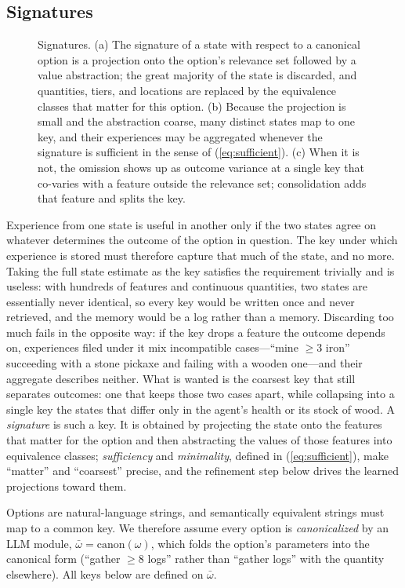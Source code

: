 \documentclass[11pt]{article}
\begin{document}
\subsection{Signatures}
\label{sec:signature}
\begin{figure}[t]
\centering

\caption{Signatures. (a) The signature of a state with respect to a canonical option is a projection onto the option's relevance set followed by a value abstraction; the great majority of the state is discarded, and quantities, tiers, and locations are replaced by the equivalence classes that matter for this option. (b) Because the projection is small and the abstraction coarse, many distinct states map to one key, and their experiences may be aggregated whenever the signature is sufficient in the sense of (\ref{eq:sufficient}). (c) When it is not, the omission shows up as outcome variance at a single key that co-varies with a feature outside the relevance set; consolidation adds that feature and splits the key.}
\label{fig:signature}
\end{figure}


Experience from one state is useful in another only if the two states agree on whatever determines the outcome of the option in question. The key under which experience is stored must therefore capture that much of the state, and no more. Taking the full state estimate as the key satisfies the requirement trivially and is useless: with hundreds of features and continuous quantities, two states are essentially never identical, so every key would be written once and never retrieved, and the memory would be a log rather than a memory. Discarding too much fails in the opposite way: if the key drops a feature the outcome depends on, experiences filed under it mix incompatible cases---``mine $\ge 3$ iron'' succeeding with a stone pickaxe and failing with a wooden one---and their aggregate describes neither. What is wanted is the coarsest key that still separates outcomes: one that keeps those two cases apart, while collapsing into a single key the states that differ only in the agent's health or its stock of wood. A \emph{signature} is such a key. It is obtained by projecting the state onto the features that matter for the option and then abstracting the values of those features into equivalence classes; \emph{sufficiency} and \emph{minimality}, defined in (\ref{eq:sufficient}), make ``matter'' and ``coarsest'' precise, and the refinement step below drives the learned projections toward them.

Options are natural-language strings, and semantically equivalent strings must map to a common key. We therefore assume every option is \emph{canonicalized} by an LLM module, $\bar\omega=\mathrm{canon}(\omega)$, which folds the option's parameters into the canonical form (``gather $\ge 8$ logs'' rather than ``gather logs'' with the quantity elsewhere). All keys below are defined on $\bar\omega$.
\end{document}
